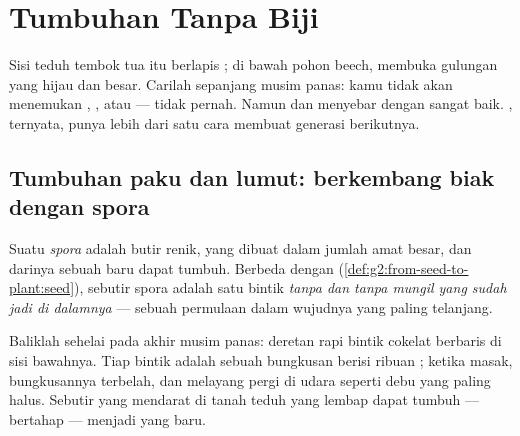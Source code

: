 \chapter{Tumbuhan Tanpa Biji}\label{ch:g4:plants-without-seeds}

Sisi teduh tembok tua itu berlapis ; di bawah pohon beech,
 membuka gulungan  yang hijau dan besar. Carilah
sepanjang musim panas: kamu tidak akan menemukan , , atau
 --- tidak pernah. Namun  dan  menyebar dengan
sangat baik. , ternyata, punya lebih dari satu cara membuat
generasi berikutnya.

\section{Tumbuhan paku dan lumut: berkembang biak dengan spora}

\begin{definition}[Spora]\label{def:g4:plants-without-seeds:spore}
Suatu \emph{spora} adalah butir renik, yang dibuat dalam
jumlah amat besar, dan darinya sebuah  baru dapat tumbuh.
Berbeda dengan  (\cref{def:g2:from-seed-to-plant:seed}), sebutir
spora adalah satu bintik \emph{tanpa  dan tanpa
 mungil yang sudah jadi di dalamnya} --- sebuah permulaan
dalam wujudnya yang paling telanjang.
\end{definition}

\begin{example}\label{ex:g4:plants-without-seeds:fern}
Baliklah sehelai   pada akhir musim panas: deretan
rapi bintik cokelat berbaris di sisi bawahnya. Tiap bintik adalah
sebuah bungkusan berisi ribuan ; ketika masak, bungkusannya
terbelah, dan  melayang pergi di udara seperti debu yang
paling halus. Sebutir  yang mendarat di tanah teduh yang lembap
dapat tumbuh --- bertahap --- menjadi  yang baru.
\end{example}

